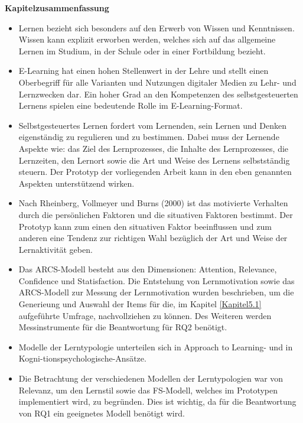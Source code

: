     \textbf{Kapitelzusammenfassung} 
    \begin{itemize}
        \item Lernen bezieht sich besonders auf den Erwerb von Wissen und Kenntnissen. Wissen kann explizit erworben werden, welches sich auf das allgemeine Lernen im Studium, in der Schule oder in einer Fortbildung bezieht.
        \item E-Learning hat einen hohen Stellenwert in der Lehre und stellt einen Oberbegriff für alle Varianten und Nutzungen digitaler Medien zu Lehr- und Lernzwecken dar. Ein hoher Grad an den Kompetenzen des selbstgesteuerten Lernens spielen eine bedeutende Rolle im E-Learning-Format.
        \item Selbstgesteuertes Lernen fordert vom Lernenden, sein Lernen und Denken eigenständig zu regulieren und zu bestimmen. Dabei muss der Lernende Aspekte wie: 
        das Ziel des Lernprozesses, die Inhalte des Lernprozesses, die Lernzeiten, den Lernort sowie die Art und Weise des Lernens selbstständig steuern. Der Prototyp der vorliegenden Arbeit kann in den eben genannten Aspekten unterstützend wirken.
        \item Nach Rheinberg, Vollmeyer und Burns (2000) ist das motivierte Verhalten durch die persönlichen Faktoren und die situativen Faktoren bestimmt. Der Prototyp kann zum einen den situativen 
        Faktor beeinflussen und zum anderen eine Tendenz zur richtigen Wahl bezüglich der Art und Weise der Lernaktivität geben.
        \item Das ARCS-Modell besteht aus den Dimensionen: Attention, Relevance, Confidence und Statisfaction.
         Die Entstehung von Lernmotivation sowie das ARCS-Modell zur Messung der Lernmotivation wurden beschrieben, um die Generieung und Auswahl der Items für die, im Kapitel \ref{Kapitel5.1} aufgeführte Umfrage, nachvollziehen zu können. Des Weiteren werden Messinstrumente für die Beantwortung für RQ2 benötigt.
        \item Modelle der Lerntypologie unterteilen sich in \glqq Approach to Learning-\grqq{} und in \glqq Kogni-tionspsychologische-Ansätze\grqq{}.
        \item Die Betrachtung der verschiedenen Modellen der Lerntypologien war von Relevanz, um den Lernstil sowie das 
        FS-Modell, welches im Prototypen implementiert wird, zu begründen.
        Dies ist wichtig, da für die Beantwortung von RQ1 ein geeignetes Modell benötigt wird.

    \end{itemize}

    



